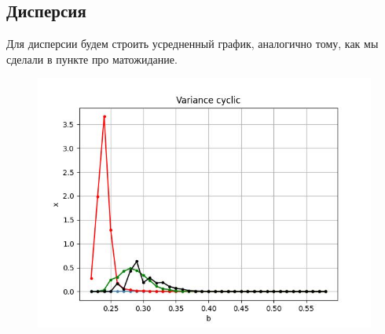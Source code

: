 \subsection{Дисперсия}

        Для дисперсии будем строить усредненный график, аналогично тому, как мы сделали в пункте про матожидание.

        
        \begin{figure}
            \centering
            \includegraphics[width=\textwidth]{stochastic/images/variance_cyclic.jpg}
        
            \captionsetup{justification=centering}
            \caption{}
            \label{variance_cyclic}
        \end{figure}